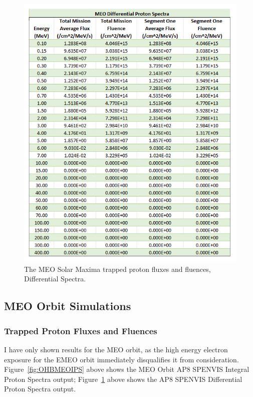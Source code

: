 \documentclass[11pt]{article}
\begin{document}
\begin{figure}[H]
\begin{minipage}{\dimexpr.5\textwidth-1em}
        \includegraphics[width=1\linewidth]{MEO_TPSM_DPS.png}
        \caption{The MEO Solar Maxima trapped proton fluxes and fluences, Differential Spectra.}
        \label{fig:OHBMEODPS}
    \end{minipage}
\end{figure}

\subsection{MEO Orbit Simulations}

\subsubsection{Trapped Proton Fluxes and Fluences}

I have only shown results for the MEO orbit, as the high energy electron exposure for the EMEO orbit immediately disqualifies it from  consideration. Figure~\ref{fig:OHBMEOIPS} above shows the MEO Orbit AP8 SPENVIS Integral Proton Spectra output; Figure~\ref{fig:OHBMEODPS} above shows the AP8 SPENVIS Differential Proton Spectra output.
\end{document}
